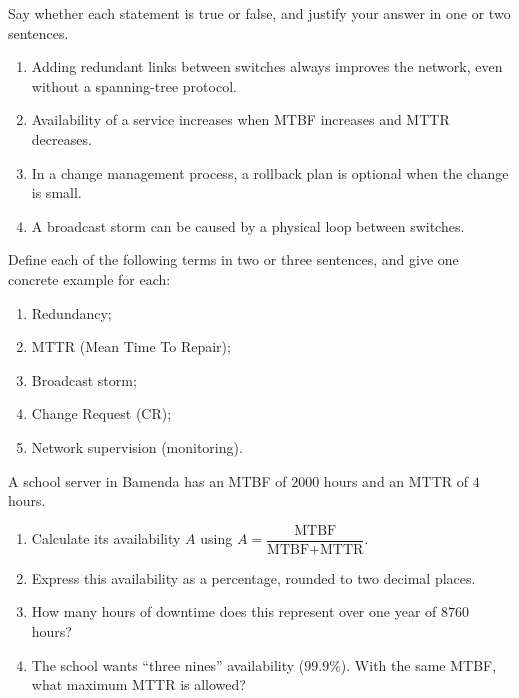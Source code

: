 \documentclass[11pt]{article}
\newcounter{popsec}
\newcounter{popsub}
\newcommand{\courssub}[1]{%
  \stepcounter{popsub}%
  \par\vspace{9pt}\noindent{\popxbold\fontsize{11.5}{13}\selectfont\color{popink}{\color{poporange}\thepopsec.\thepopsub}\hspace{6pt}#1}\par\nopagebreak\vspace{4pt}
}
\begin{document}
\begin{exercice}
Say whether each statement is true or false, and justify your answer in one or two sentences.
\begin{enumerate}
\item Adding redundant links between switches always improves the network, even without a spanning-tree protocol.
\item Availability of a service increases when MTBF increases and MTTR decreases.
\item In a change management process, a rollback plan is optional when the change is small.
\item A broadcast storm can be caused by a physical loop between switches.
\end{enumerate}
\end{exercice}

\begin{exercice}[Definitions]
Define each of the following terms in two or three sentences, and give one concrete example for each:
\begin{enumerate}
\item Redundancy;
\item MTTR (Mean Time To Repair);
\item Broadcast storm;
\item Change Request (CR);
\item Network supervision (monitoring).
\end{enumerate}
\end{exercice}

\begin{exercice}
A school server in Bamenda has an MTBF of $2000$ hours and an MTTR of $4$ hours.
\begin{enumerate}
\item Calculate its availability $A$ using $A = \dfrac{\text{MTBF}}{\text{MTBF}+\text{MTTR}}$.
\item Express this availability as a percentage, rounded to two decimal places.
\item How many hours of downtime does this represent over one year of $8760$ hours?
\item The school wants ``three nines'' availability ($99.9\%$). With the same MTBF, what maximum MTTR is allowed?
\end{enumerate}
\end{exercice}

\courssub{I practise}
\end{document}
